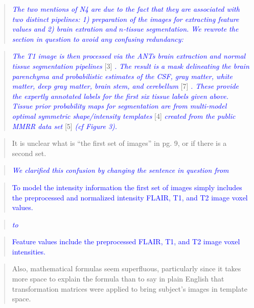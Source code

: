 \documentclass[12pt,]{article}
\begin{document}
\begin{quote}
\emph{\textcolor{blue}{The two mentions of N4 are due to the fact that they are associated
with two distinct pipelines:  1) preparation of the images for extracting feature values
and 2) brain extration and $n$-tissue segmentation.  We rewrote the section in question
to avoid any confusing redundancy:}}
\end{quote}

\begin{quote}
\emph{\textcolor{blue}{The T1 image is then processed via the ANTs brain
extraction and normal tissue segmentation pipelines}} {[}3{]}
\emph{\textcolor{blue}{.  The result is a mask delineating the brain
parenchyma and probabilistic estimates of the CSF, gray matter, white matter,
deep gray matter, brain stem, and cerebellum}} {[}7{]}
\emph{\textcolor{blue}{.  These provide the expertly annotated labels for the
first six tissue labels given above.  Tissue prior probability maps for segmentation
are from multi-model optimal symmetric shape/intensity templates}}
{[}4{]} \emph{\textcolor{blue}{created from the public MMRR data set}}
{[}5{]} \emph{\textcolor{blue}{(cf Figure 3).}}
\end{quote}

\begin{quote}
It is unclear what is ``the first set of images'' in pg. 9, or if there
is a second set.
\end{quote}

\begin{quote}
\emph{\textcolor{blue}{We clarified this confusion by changing the sentence in question from}}
\end{quote}

\begin{quote}
\textcolor{blue}{To model the intensity information the first set of images simply includes the
preprocessed and normalized intensity FLAIR, T1, and T2 image voxel values.}
\end{quote}

\begin{quote}
\emph{\textcolor{blue}{to}}
\end{quote}

\begin{quote}
\textcolor{blue}{Feature values include the preprocessed FLAIR, T1, and T2 image voxel intensities.}
\end{quote}

\begin{quote}
Also, mathematical formulas seem superfluous, particularly since it
takes more space to explain the formula than to say in plain English
that transformation matrices were applied to bring subject's images in
template space.
\end{quote}
\end{document}
